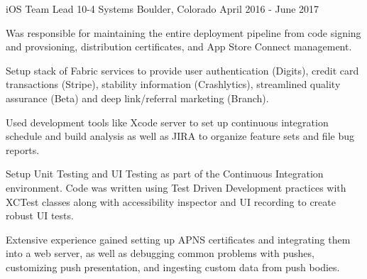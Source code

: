 \begin{cventries}
{\begin{cvitems}
\begin{footnotesize}
        \end{footnotesize} 
      \end{cvitems}
    }
  \cventry
    {iOS Team Lead}
    {10-4 Systems}
    {Boulder, Colorado}
    {April 2016 - June 2017}
    {
      \begin{cvitems}
      \begin{footnotesize}
        \item {Was responsible for maintaining the entire deployment pipeline from code signing and provsioning, distribution certificates, and App Store Connect management.}
        \item {Setup stack of Fabric services to provide user authentication (Digits), credit card transactions (Stripe), stability information (Crashlytics), streamlined quality assurance (Beta) and deep link/referral marketing (Branch).}
        \item {Used development tools like Xcode server to set up continuous integration schedule and build analysis as well as JIRA to organize feature sets and file bug reports.}
        \item {Setup Unit Testing and UI Testing as part of the Continuous Integration environment. Code was written using Test Driven Development practices with XCTest classes along with accessibility inspector and UI recording to create robust UI tests.}
        \item {Extensive experience gained setting up APNS certificates and integrating them into a web server, as well as debugging common problems with pushes, customizing push presentation, and ingesting custom data from push bodies.}
        \end{footnotesize} 
      \end{cvitems}
    }
\end{cventries}
